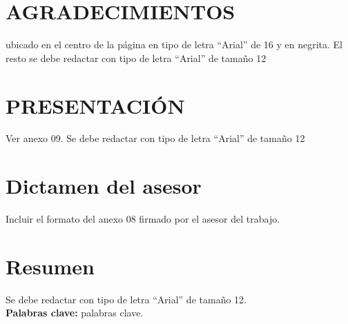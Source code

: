 \documentclass[12pt,oneside,a4paper]{book}
\begin{document}
\chapter*{\centering AGRADECIMIENTOS}

ubicado en el centro de la página en tipo de letra “Arial” de 16 y en negrita. El resto se debe redactar con tipo de letra “Arial” de tamaño 12
 

\chapter*{\centering PRESENTACIÓN}

Ver anexo 09. Se debe redactar con tipo de letra “Arial” de tamaño 12
 

\chapter*{Dictamen del asesor}

Incluir el formato del anexo 08 firmado por el asesor del trabajo.
 


\chapter*{Resumen}

Se debe redactar con tipo de letra “Arial” de tamaño 12. \\


\noindent \textbf{Palabras clave:} palabras clave.
\end{document}
